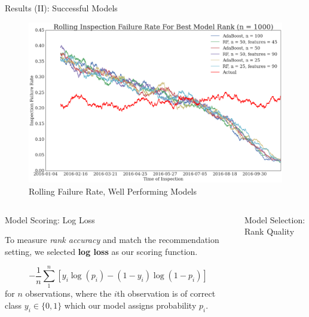 \documentclass[final]{beamer}
\newlength{\onecolwid}
\newlength{\twocolwid}
\begin{document}
\begin{frame}[t]
\begin{columns}[t]
\begin{column}{\twocolwid}
\begin{columns}[t, totalwidth=\twocolwid]
\begin{column}{\onecolwid}\vspace{-.6in.}
\begin{block}{Results (II): Successful Models}
\begin{figure}
\includegraphics[width=\linewidth]{figures/exploration/rolling_failure_good.png}
\caption{Rolling Failure Rate, Well Performing Models}
\end{figure}
\end{block}
\end{column}
\end{columns}

\vspace{-1in}
\begin{columns}[t, totalwidth=\twocolwid]
\begin{column}{\onecolwid}
\begin{alertblock}{Model Scoring: Log Loss}

To measure \textit{rank accuracy} and match the 
recommendation setting, 
we selected \textbf{log loss} as our scoring function.

\begin{equation}
-\frac{1}{n} \sum_{1}^{n} [y_i \log(p_i)-(1-y_i)\log(1-p_i)]
\end{equation}
for $n$ observations, where the $i$th observation is of correct class $y_i \in \{0,1\}$ 
which our model assigns probability $p_i$.

\end{alertblock}
\end{column}

\begin{column}{\onecolwid}
\begin{alertblock}{Model Selection: Rank Quality}


\end{alertblock}
\end{column}
\end{columns}
\end{column}
\end{columns}
\end{frame}
\end{document}
